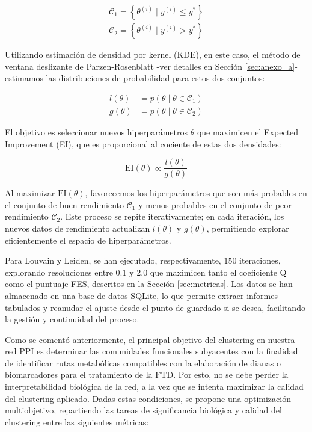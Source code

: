 \begin{equation}
	\begin{aligned}
		\mathcal{C}_1 = \left\{ \theta^{(i)} \mid y^{(i)} \leq y^* \right\} \\
		\mathcal{C}_2 = \left\{ \theta^{(i)} \mid y^{(i)} > y^* \right\}
	\end{aligned}
\end{equation}

Utilizando estimación de densidad por kernel (KDE), en este caso, el método de ventana deslizante de Parzen-Rosenblatt -ver detalles en Sección \ref{sec:anexo_a}- estimamos las distribuciones de probabilidad para estos dos conjuntos:

\begin{equation}
	\begin{aligned}
		l(\theta) &= p(\theta \mid \theta \in \mathcal{C}_1) \\
		g(\theta) &= p(\theta \mid \theta \in \mathcal{C}_2)
	\end{aligned}
\end{equation}

El objetivo es seleccionar nuevos hiperparámetros \( \theta \) que maximicen el Expected Improvement (EI), que es proporcional al cociente de estas dos densidades:

\begin{equation}
	\mathrm{EI}(\theta) \propto \frac{l(\theta)}{g(\theta)}
\end{equation}

Al maximizar \( \mathrm{EI}(\theta) \), favorecemos los hiperparámetros que son más probables en el conjunto de buen rendimiento \( \mathcal{C}_1 \) y menos probables en el conjunto de peor rendimiento \( \mathcal{C}_2 \). Este proceso se repite iterativamente; en cada iteración, los nuevos datos de rendimiento actualizan \( l(\theta) \) y \( g(\theta) \), permitiendo explorar eficientemente el espacio de hiperparámetros.

Para Louvain y Leiden, se han ejecutado, respectivamente, \(150\) iteraciones, explorando resoluciones entre \(0.1\) y \(2.0\) que maximicen tanto el coeficiente Q como el puntuaje FES, descritos en la Sección \ref{sec:metricas}. Los datos se han almacenado en una base de datos SQLite, lo que permite extraer informes tabulados y reanudar el ajuste desde el punto de guardado si se desea, facilitando la gestión y continuidad del proceso.


Como se comentó anteriormente, el principal objetivo del clustering en nuestra red PPI es determinar las comunidades funcionales subyacentes con la finalidad de identificar rutas metabólicas compatibles con la elaboración de dianas o biomarcadores para el tratamiento de la FTD. Por esto, no se debe perder la interpretabilidad biológica de la red, a la vez que se intenta maximizar la calidad del clustering aplicado. Dadas estas condiciones, se propone una optimización multiobjetivo, repartiendo las tareas de significancia biológica y calidad del clustering entre las siguientes métricas:

